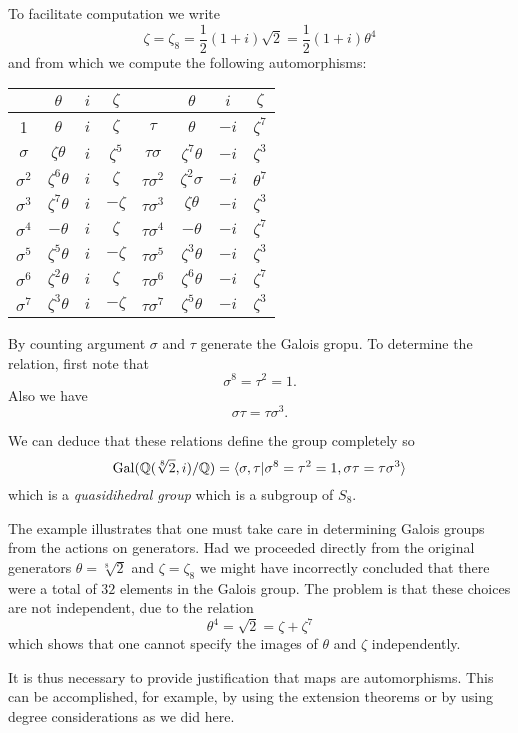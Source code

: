 \documentclass[a4paper]{article}
\begin{document}
\begin{eg}
  To facilitate computation we write
  \[ \zeta = \zeta_8 = \frac{1}{2}(1+i) \sqrt 2 = \frac{1}{2}(1+i) \theta^4 \]
  and from which we compute the following automorphisms:
  \begin{center}
    \begin{tabular}[h]{c c c c||c c c c}
       & $\theta$ & $i$ & $\zeta$ & & $\theta$ & $i$ & $\zeta$ \\
      \hline
      1 & $\theta$ & $i$ & $\zeta$ & $\tau$ & $\theta$ & $-i$ & $\zeta^7$ \\
      \hline
      $\sigma$ & $\zeta\theta$ & $i$ & $\zeta^5$ & $\tau\sigma$ & $\zeta^7 \theta$ & $-i$ & $\zeta^3$ \\
      \hline
      $\sigma^2$ & $\zeta^6\theta$ & $i$ & $\zeta$ & $\tau\sigma^2$ & $\zeta^2\sigma$ & $-i$ & $\theta^7$ \\
      \hline
      $\sigma^3$ & $\zeta^7\theta$ & $i$ & $-\zeta$ & $\tau\sigma^3$ & $\zeta\theta$ & $-i$ & $\zeta^3$ \\
      \hline
      $\sigma^4$ & $-\theta$ & $i$ & $\zeta$ & $\tau\sigma^4$ & $-\theta$ & $-i$ & $\zeta^7$ \\
      \hline
      $\sigma^5$ & $\zeta^5\theta$ & $i$ & $-\zeta$ & $\tau\sigma^5$ & $\zeta^3\theta$ & $-i$ & $\zeta^3$ \\
      \hline
      $\sigma^6$ & $\zeta^2\theta$ & $i$ & $\zeta$ & $\tau\sigma^6$ & $\zeta^6\theta$ & $-i$ & $\zeta^7$ \\
      \hline
      $\sigma^7$ & $\zeta^3\theta$ & $i$ & $-\zeta$ & $\tau\sigma^7$ & $\zeta^5\theta$ & $-i$ & $\zeta^3$ \\
      \hline
    \end{tabular}
  \end{center}

  By counting argument $\sigma$ and $\tau$ generate the Galois gropu. To determine the relation, first note that
  \[ \sigma^8 = \tau^2 = 1.\]
  Also we have
  \[ \sigma\tau = \tau\sigma^3.\]

  We can deduce that these relations define the group completely so
  \[ \gal(\mathbb{Q}(\sqrt[8] 2,i)/\mathbb{Q}) = \langle \sigma, \tau | \sigma^8 = \tau^2 = 1, \sigma\tau = \tau\sigma^3 \rangle\]
  which is a \emph{quasidihedral group} which is a subgroup of $S_8$.
\end{eg}

\begin{rmk}
  The example illustrates that one must take care in determining Galois groups from the actions on generators. Had we proceeded directly from the original generators $\theta = \sqrt[8] 2$ and $\zeta = \zeta_8$ we might have incorrectly concluded that there were a total of $32$ elements in the Galois group. The problem is that these choices are not independent, due to the relation
  \[ \theta^4 = \sqrt 2 = \zeta + \zeta^7 \]
  which shows that one cannot specify the images of $\theta$ and $\zeta$ independently.

  It is thus necessary to provide justification that maps are automorphisms. This can be accomplished, for example, by using the extension theorems or by using degree considerations as we did here.
\end{rmk}
\end{document}
